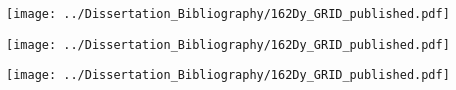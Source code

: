 \begin{center}
\texttt{[image: ../Dissertation\_Bibliography/162Dy\_GRID\_published.pdf]}
\end{center}

\begin{center}
\texttt{[image: ../Dissertation\_Bibliography/162Dy\_GRID\_published.pdf]}
\end{center}

\begin{center}
\texttt{[image: ../Dissertation\_Bibliography/162Dy\_GRID\_published.pdf]}
\end{center}
